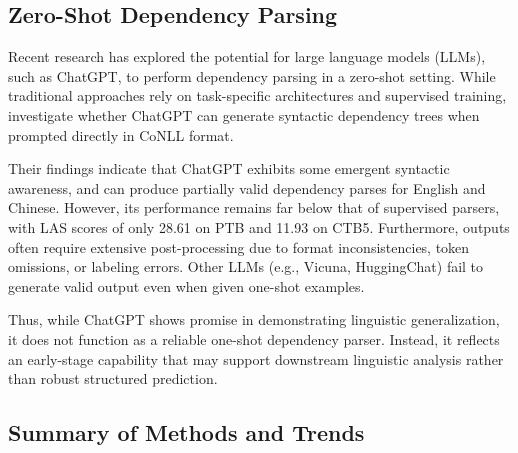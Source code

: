 \subsection{Zero-Shot Dependency Parsing}

Recent research has explored the potential for large language models (LLMs), such as ChatGPT, to perform dependency parsing in a zero-shot setting. While traditional approaches rely on task-specific architectures and supervised training, \citet{lin2023chatgpt} investigate whether ChatGPT can generate syntactic dependency trees when prompted directly in CoNLL format.

Their findings indicate that ChatGPT exhibits some emergent syntactic awareness, and can produce partially valid dependency parses for English and Chinese. However, its performance remains far below that of supervised parsers, with LAS scores of only 28.61 on PTB and 11.93 on CTB5. Furthermore, outputs often require extensive post-processing due to format inconsistencies, token omissions, or labeling errors. Other LLMs (e.g., Vicuna, HuggingChat) fail to generate valid output even when given one-shot examples.

Thus, while ChatGPT shows promise in demonstrating linguistic generalization, it does not function as a reliable one-shot dependency parser. Instead, it reflects an early-stage capability that may support downstream linguistic analysis rather than robust structured prediction.

\subsection{Summary of Methods and Trends}

